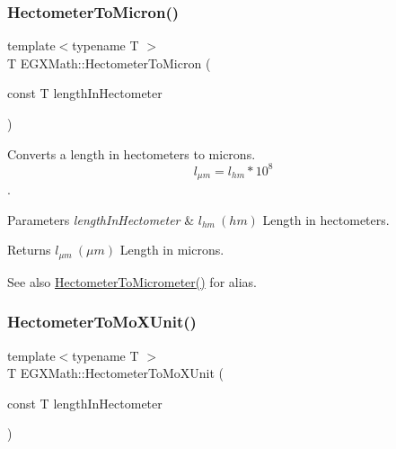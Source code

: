\subsubsection{\texorpdfstring{Hectometer\+To\+Micron()}{HectometerToMicron()}}
{\footnotesize\ttfamily template$<$typename T $>$ \\
T E\+G\+X\+Math\+::\+Hectometer\+To\+Micron (\begin{DoxyParamCaption}\item[{const T}]{length\+In\+Hectometer }\end{DoxyParamCaption})}



Converts a length in hectometers to microns. \[ l_{\mu m}=l_{hm} * 10^{8} \]. 


\begin{DoxyParams}{Parameters}
{\em length\+In\+Hectometer} & $ l_{hm}\ (hm)$ Length in hectometers. \\
\hline
\end{DoxyParams}
\begin{DoxyReturn}{Returns}
$ l_{\mu m}\ (\mu m)$ Length in microns. 
\end{DoxyReturn}
\begin{DoxySeeAlso}{See also}
\mbox{\hyperlink{group___e_g_x_math-_conversions-_length_conversions-_hectometer-_s_i_ga3f5229b11d79e20007ac9320a317272a}{Hectometer\+To\+Micrometer()}} for alias. 
\end{DoxySeeAlso}
\mbox{\label{group___e_g_x_math-_conversions-_length_conversions-_hectometer-_non-_s_i_gac2840604040746ae9a4c51fd1bb3e6f6}} 
\subsubsection{\texorpdfstring{Hectometer\+To\+Mo\+X\+Unit()}{HectometerToMoXUnit()}}
{\footnotesize\ttfamily template$<$typename T $>$ \\
T E\+G\+X\+Math\+::\+Hectometer\+To\+Mo\+X\+Unit (\begin{DoxyParamCaption}\item[{const T}]{length\+In\+Hectometer }\end{DoxyParamCaption})}



